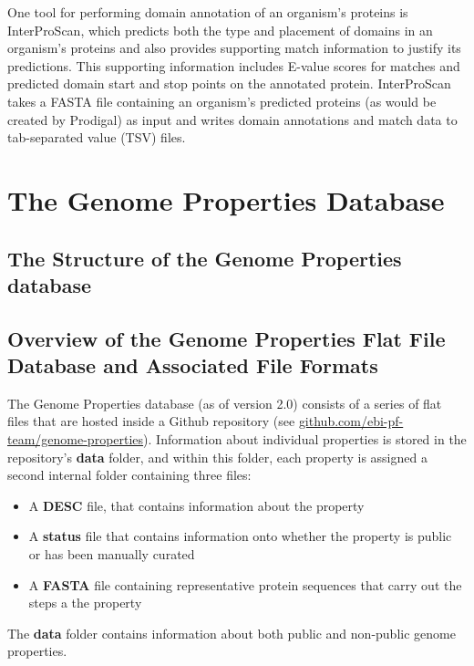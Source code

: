 One tool for performing domain annotation of an organism's proteins is InterProScan, which predicts both the type and placement of domains in an organism's proteins and also provides supporting match information to justify its predictions. This supporting information includes E-value scores for matches and predicted domain start and stop points on the annotated protein. InterProScan takes a FASTA file \cite{pearson19905} containing an organism's predicted proteins (as would be created by Prodigal) as input and writes domain annotations and match data to tab-separated value (TSV) files.

\section{The Genome Properties Database}

\subsection{The Structure of the Genome Properties database}

\subsection{Overview of the Genome Properties Flat File Database and Associated File Formats} \label{Genome-Properties-Files} \label{genome-properties-files}

The Genome Properties database (as of version 2.0) consists of a series of flat files that are hosted inside a Github repository (see \href{github.com/ebi-pf-team/genome-properties}{github.com/ebi-pf-team/genome-properties}). Information about individual properties is stored in the repository's \textbf{data} folder, and within this folder, each property is assigned a second internal folder containing three files: 
\begin{itemize}
\item A \textbf{DESC} file, that contains information about the property
\item A \textbf{status} file that contains information onto whether the property is public or has been manually curated
\item A \textbf{FASTA} \cite{pearson19905} file containing representative protein sequences that carry out the steps a the property
\end{itemize}
The \textbf{data} folder contains information about both public and non-public genome properties. 

